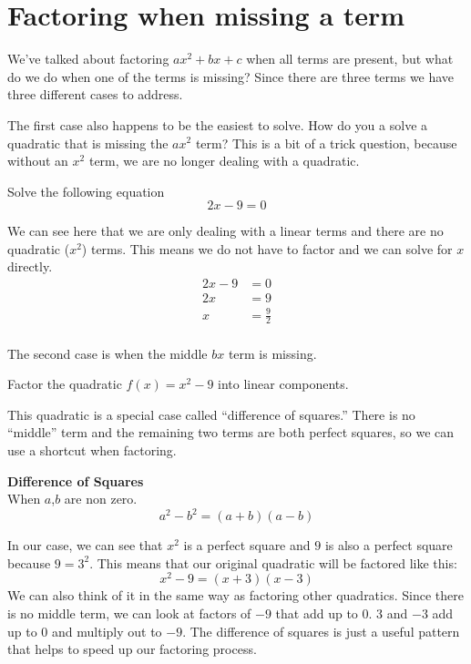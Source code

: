 \documentclass{ximera}
\begin{document}
\section{Factoring when missing a term}
We've talked about factoring $ax^2+bx+c$ when all terms are present, but what do we do when one of the terms is missing? Since there are three terms we have three different cases to address.

The first case also happens to be the easiest to solve. How do you a solve a quadratic that is missing the $ax^2$ term? This is a bit of a trick question, because without an $x^2$ term, we are no longer dealing with a quadratic. 
\begin{example}
Solve the following equation
\[
2x-9=0
\]

\begin{explanation}
We can see here that we are only dealing with a linear terms and there are no quadratic ($x^2$) terms. This means we do not have to factor and we can solve for $x$ directly.
\begin{align*}
2x-9&=0\\
2x&=9\\
x&=\frac{9}{2}\\
\end{align*}
\end{explanation}
\end{example}
The second case is when the middle $bx$ term is missing. 
\begin{example}
Factor the quadratic $f(x)=x^2-9$ into linear components.\\

\begin{explanation}
This quadratic is a special case called ``difference of squares.'' There is no ``middle'' term and the remaining two terms are both perfect squares, so we can use a shortcut when factoring.
\begin{callout}
\textbf{Difference of Squares}\\
When $a$,$b$ are non zero.
\[
a^2-b^2=(a+b)(a-b)
\]
\end{callout}
In our case, we can see that $x^2$ is a perfect square and $9$ is also a perfect square because $9=3^2$. This means that our original quadratic will be factored like this:
\[
x^2-9=(x+3)(x-3)
\]
We can also think of it in the same way as factoring other quadratics. Since there is no middle term, we can look at factors of $-9$ that add up to $0$. $3$ and $-3$ add up to $0$ and multiply out to $-9$. The difference of squares is just a useful pattern that helps to speed up our factoring process.
\end{explanation}
\end{example}
\end{document}

